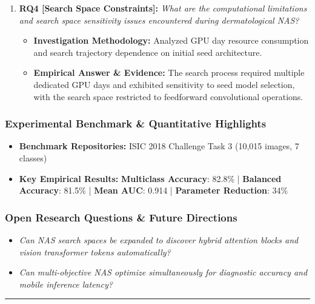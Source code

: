 \begin{enumerate}[label=\textbf{\arabic*.}, leftmargin=*]
\begin{itemize}[leftmargin=1.5em]
  \end{itemize}
  \item \textbf{RQ4 [Search Space Constraints]:} \textit{What are the computational limitations and search space sensitivity issues encountered during dermatological NAS?}
  \begin{itemize}[leftmargin=1.5em]
    \item \textbf{Investigation Methodology:} Analyzed GPU day resource consumption and search trajectory dependence on initial seed architecture.
    \item \textbf{Empirical Answer \& Evidence:} The search process required multiple dedicated GPU days and exhibited sensitivity to seed model selection, with the search space restricted to feedforward convolutional operations.
  \end{itemize}
\end{enumerate}

\subsubsection*{Experimental Benchmark \& Quantitative Highlights}
\begin{itemize}[leftmargin=*]
  \item \textbf{Benchmark Repositories:} ISIC 2018 Challenge Task 3 (10,015 images, 7 classes)
  \item \textbf{Key Empirical Results:} \textbf{Multiclass Accuracy}: 82.8\% \quad | \quad \textbf{Balanced Accuracy}: 81.5\% \quad | \quad \textbf{Mean AUC}: 0.914 \quad | \quad \textbf{Parameter Reduction}: 34\%
\end{itemize}

\subsubsection*{Open Research Questions \& Future Directions}
\begin{itemize}[leftmargin=*]
  \item \textit{Can NAS search spaces be expanded to discover hybrid attention blocks and vision transformer tokens automatically?}
  \item \textit{Can multi-objective NAS optimize simultaneously for diagnostic accuracy and mobile inference latency?}
\end{itemize}
\vspace{0.8em}\hrule\vspace{1.2em}
